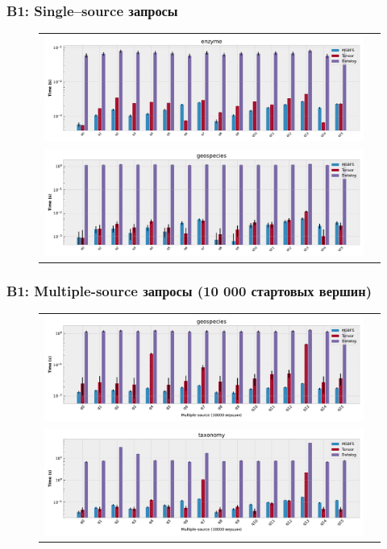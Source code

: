 \documentclass{beamer}
\begin{document}
\begin{frame}[fragile]
  \frametitle{B1: Single--source запросы}
  \begin{figure}
    \begin{tabular}{cc}
      \includegraphics[width=110mm]{pictures/enzyme_ss.pdf}     \\
      \includegraphics[width=110mm]{pictures/geospecies_ss.pdf} \\
    \end{tabular}
  \end{figure}
\end{frame}

\begin{frame}[fragile]
  \frametitle{B1: Multiple-source запросы (10 000 стартовых вершин)}
  \begin{figure}
    \begin{tabular}{cc}
      \includegraphics[width=110mm]{pictures/geospecies_10000.pdf} \\
      \includegraphics[width=110mm]{pictures/taxonomy_ms10000.pdf} \\
    \end{tabular}
  \end{figure}
\end{frame}
\end{document}
